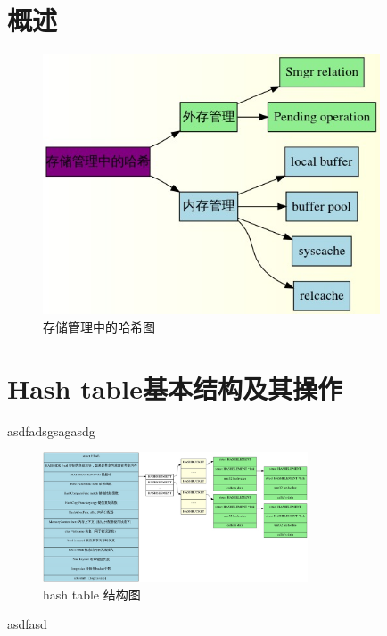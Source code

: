 \documentclass{article}
\begin{document}
\begin{CJK*}{UTF8}{gkai}
\section{概述}
\begin{figure}[!ht]
\centering
\includegraphics[width = 100mm]{index.jpg}
\caption{存储管理中的哈希图}
\label{overflow}
\end{figure}

\section{Hash table基本结构及其操作} 
asdfadsgsagasdg

\begin{figure}[!ht]
\begin{center}
\includegraphics[width=0.7\textwidth]{hash.jpg}
\caption{hash table 结构图}
\end{center}
\end{figure}

asdfasd


\end{CJK*}
\end{document}
